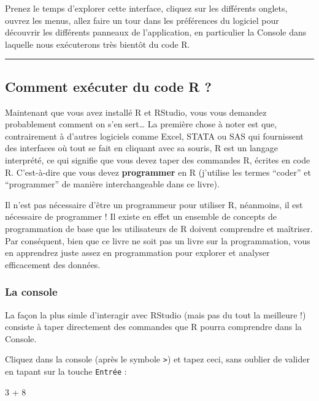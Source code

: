 \documentclass[a4paperpaper,]{article}
\newenvironment{Shaded}{\begin{snugshade}}{\end{snugshade}}
\newcommand{\DecValTok}[1]{\textcolor[rgb]{0.69,0.50,0.00}{#1}}
\newcommand{\OperatorTok}[1]{\textcolor[rgb]{0.12,0.11,0.11}{#1}}
\newcommand{\StringTok}[1]{\textcolor[rgb]{0.75,0.01,0.01}{#1}}
\begin{document}
Prenez le temps d'explorer cette interface, cliquez sur les différents onglets, ouvrez les menus, allez faire un tour dans les préférences du logiciel pour découvrir les différents panneaux de l'application, en particulier la Console dans laquelle nous exécuterons très bientôt du code R.

\begin{center}\rule{0.5\linewidth}{\linethickness}\end{center}

\hypertarget{code}{%
\subsection{Comment exécuter du code R ?}\label{code}}

Maintenant que vous avez installé R et RStudio, vous vous demandez probablement comment on s'en sert\ldots{} La première chose à noter est que, contrairement à d'autres logiciels comme Excel, STATA ou SAS qui fournissent des interfaces où tout se fait en cliquant avec sa souris, R est un langage interprété, ce qui signifie que vous devez taper des commandes R, écrites en code R. C'est-à-dire que vous devez \textbf{programmer} en R (j'utilise les termes ``coder'' et ``programmer'' de manière interchangeable dans ce livre).

Il n'est pas nécessaire d'être un programmeur pour utiliser R, néanmoins, il est nécessaire de programmer ! Il existe en effet un ensemble de concepts de programmation de base que les utilisateurs de R doivent comprendre et maîtriser. Par conséquent, bien que ce livre ne soit pas un livre sur la programmation, vous en apprendrez juste assez en programmation pour explorer et analyser efficacement des données.

\hypertarget{la-console}{%
\subsubsection{La console}\label{la-console}}

La façon la plus simle d'interagir avec RStudio (mais pas du tout la meilleure !) consiste à taper directement des commandes que R pourra comprendre dans la Console.

Cliquez dans la console (après le symbole \texttt{\textgreater{}}) et tapez ceci, sans oublier de valider en tapant sur la touche \texttt{Entrée} :

\begin{Shaded}
\begin{Highlighting}[]
\DecValTok{3} \OperatorTok{+}\StringTok{ }\DecValTok{8}
\end{Highlighting}
\end{Shaded}
\end{document}
